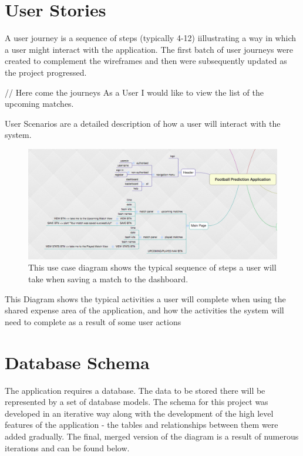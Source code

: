 \section{User Stories}
\label{userstories_prototype}
A user journey is a sequence of steps (typically 4-12) iillustrating a way in which a user might interact with the application. The first batch of user journeys were created to complement the wireframes and then were subsequently updated as the project progressed.

// Here come the journeys
As a User I would like to view the list of the upcoming matches.

User Scenarios are a detailed description of how a user will interact with the system. 


\begin{figure}[H]
	\begin{center}
		\includegraphics[width=.90\textwidth]{design/images/mindmap}
		\caption{This use case diagram shows the typical sequence of steps a user will take when saving a match to the dashboard.} \label{fig:using:usecase1}
	\end{center}
\end{figure}
This Diagram shows the typical activities a user will complete when using the shared expense area of the application, and how the activities the system will need to complete as a result of some user actions

\section{Database Schema}
\label{databaseschema_prototype}
The application requires a database. The data to be stored there will be represented by a set of database models. The schema for this project was developed in an iterative way along with the development of the high level features of the application - the tables and relationships between them were added gradually. The final, merged version of the diagram is a result of numerous iterations and can be found below.

